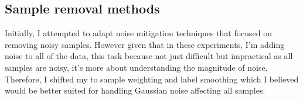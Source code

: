{%

\subsection{Sample removal methods}

Initially, I attempted to adapt noise mitigation techniques that focused on removing noisy samples. However given that in these experiments, I'm adding noise to all of the data, this task because not just difficult but impractical as all samples are noisy, it's more about understanding the magnitude of noise. Therefore, I shifted my to sample weighting and label smoothing which I believed would be better suited for handling Gaussian noise affecting all samples.

}
